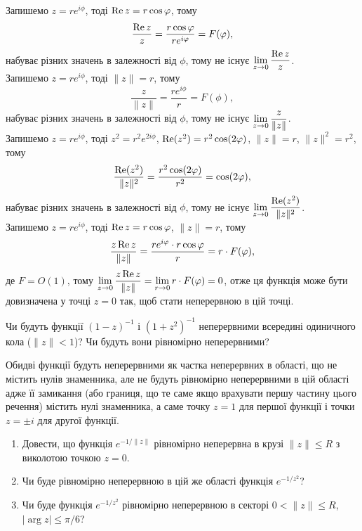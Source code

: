 \begin{solution}
    Запишемо $z = r e^{i \phi}$, тоді $\operatorname{Re}{z} = r \cos \varphi$, тому 
    \[ \dfrac{\operatorname{Re}{z}}{z} = \dfrac{r \cos \varphi}{r e^{i \varphi}} = F(\varphi),\]
    набуває різних значень в залежності від $\phi$, тому не існує $\displaystyle\lim\limits_{z \to 0} \dfrac{\operatorname{Re}{z}}{z}$. \\

    Запишемо $z = r e^{i \phi}$, тоді $\|z\| = r$, тому 
    \[ \dfrac{z}{\|z\|} = \dfrac{r e^{i \phi}}{r} = F(\phi),\]
    набуває різних значень в залежності від $\phi$, тому не існує $\displaystyle\lim\limits_{z \to 0} \dfrac{z}{\|z\|}$. \\

    Запишемо $z = r e^{i \phi}$, тоді $z^2 = r^2 e^{2 i \phi}$, $\operatorname{Re}(z^2) = r^2 \cos (2 \varphi)$, $\|z\| = r$, $\|z\|^2 = r^2$, тому 
    \[ \dfrac{\operatorname{Re}(z^2)}{\|z\|^2} = \dfrac{r^2 \cos (2 \varphi)}{r^2} = \cos (2 \varphi),\]
    набуває різних значень в залежності від $\phi$, тому не існує $\displaystyle\lim\limits_{z \to 0} \dfrac{\operatorname{Re}(z^2)}{\|z\|^2}$. \\

    Запишемо $z = r e^{i \phi}$, тоді $\operatorname{Re}{z} = r \cos \varphi$, $\|z\| = r$, тому 
    \[ \dfrac{z\operatorname{Re}{z}}{\|z\|} = \dfrac{r e^{i \varphi} \cdot r \cos \varphi}{r} = r \cdot F(\varphi), \]
    де $F = O(1)$, тому $\displaystyle\lim\limits_{z \to 0} \dfrac{z\operatorname{Re}{z}}{\|z\|} = \displaystyle\lim\limits_{r \to 0} r \cdot F(\varphi) = 0$, отже ця функція може бути довизначена у точці $z = 0$ так, щоб стати неперервною в цій точці.
\end{solution}

\begin{problem}[Волковиський, 127]
    Чи будуть функції $(1 - z)^{-1}$ і $(1 + z^2)^{-1}$ неперервними всередині одиничного кола ($\|z\| < 1$)? Чи будуть вони рівномірно неперервними?
\end{problem}

\begin{solution}
    Обидві функції будуть неперервними як частка неперервних в області, що не містить нулів знаменника, але не будуть рівномірно неперервними в цій області адже її замикання (або границя, що те саме якщо врахувати першу частину цього речення) містить нулі знаменника, а саме точку $z = 1$ для першої функції і точки $z = \pm i$ для другої функції.
\end{solution}

\begin{problem}[Волковиський, 128]
    \begin{enumerate}
        \item Довести, що функція $e^{-1 / \|z\|}$ рівномірно неперервна в крузі $\|z\| \le R$ з виколотою точкою $z = 0$.

        \item Чи буде рівномірно неперервною в цій же області функція $e^{-1 / z^2}$?

        \item Чи буде функція $e^{-1 / z^2}$ рівномірно неперервною в секторі $0 < \|z\| \le R$, $|\arg z| \le \pi / 6$?
    \end{enumerate}
\end{problem}

